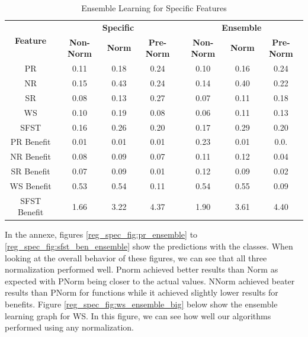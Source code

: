\documentclass[12pt,letterpaper]{article}
\begin{document}
\begin{table}[H]
\centering
\begin{tabular}{|c||c|c|c||c|c|c|}
\hline
\multirow{2}{*}{\textbf{Feature}} & \multicolumn{3}{c||}{\textbf{Specific}} & \multicolumn{3}{c|}{\textbf{Ensemble}} \\
\cline{2-7}
 & \textbf{Non-Norm} & \textbf{Norm} & \textbf{Pre-Norm} & \textbf{Non-Norm} & \textbf{Norm} & \textbf{Pre-Norm} \\
\hline
PR &  0.11 & 0.18 & 0.24 & 0.10 & 0.16 & 0.24\\
\hline
NR &  0.15 & 0.43 & 0.24 & 0.14 & 0.40 & 0.22 \\
\hline
SR &  0.08 & 0.13 & 0.27 & 0.07 & 0.11 & 0.18\\
\hline
WS & 0.10 & 0.19 & 0.08 & 0.06 & 0.11 & 0.13\\
\hline
SFST &  0.16 & 0.26 & 0.20 & 0.17 & 0.29 & 0.20\\
\hline
PR Benefit & 0.01 & 0.01 & 0.01 & 0.23 & 0.01 & 0.0.\\
\hline
NR Benefit &  0.08 & 0.09 & 0.07 & 0.11 & 0.12 & 0.04\\
\hline
SR Benefit &  0.07 & 0.09 & 0.01 & 0.12 & 0.09 & 0.02\\
\hline
WS Benefit &  0.53 & 0.54 & 0.11 & 0.54 & 0.55 & 0.09 \\
\hline
SFST Benefit & 1.66 & 3.22 & 4.37 & 1.90 & 3.61 & 4.40\\
\hline
\end{tabular}
\caption{Ensemble Learning for Specific Features}
\label{reg_spec_tab:ensemble}
\end{table}


In the annexe, figures \ref{reg_spec_fig:pr_ensemble} to \ref{reg_spec_fig:sfst_ben_ensemble} show the predictions with the classes.
When looking at the overall behavior of these figures, we can see that all three normalization performed well.
Pnorm achieved better results than Norm as expected with PNorm being closer to the actual values.
NNorm achieved beater results than PNorm for functions while it achieved slightly lower results for benefits.
Figure \ref{reg_spec_fig:ws_ensemble_big} below show the ensemble learning graph for \ac{WS}.
In this figure, we can see how well our algorithms performed using any normalization.
\end{document}

